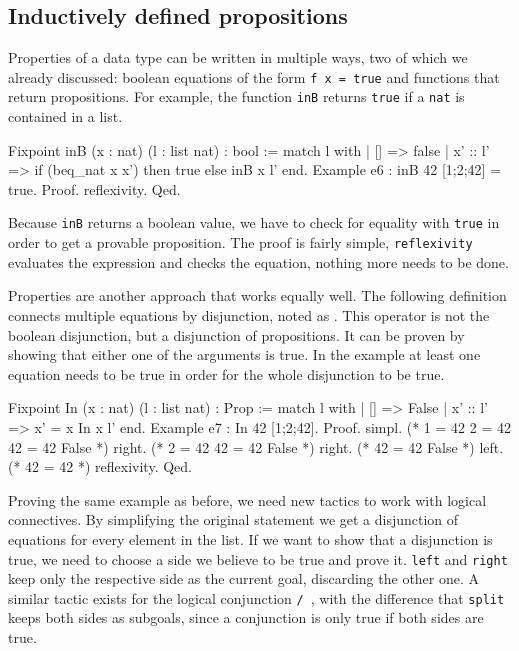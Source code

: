 \documentclass[paper = a4, fleqn, twoside]{scrreprt}
\newcommand{\coqinline}[1]{\texttt{#1}}
\begin{document}
\subsection{Inductively defined propositions}
\label{induprop}
Properties of a data type can be written in multiple ways, two of which we already discussed: boolean equations of the form \coqinline{f x = true} and functions that return propositions. For example, the function \coqinline{inB} returns \coqinline{true} if a \coqinline{nat} is contained in a list.
\begin{coqcode}
Fixpoint inB (x : nat) (l : list nat) : bool :=
  match l with
  | [] => false
  | x' :: l' => if (beq_nat x x') then true else inB x l'
  end.
Example e6 : inB 42 [1;2;42] = true.
Proof. reflexivity. Qed.
\end{coqcode}
Because \coqinline{inB} returns a boolean value, we have to check for equality with \coqinline{true} in order to get a provable proposition. The proof is fairly simple, \coqinline{reflexivity} evaluates the expression and checks the equation, nothing more needs to be done.\\
\par \noindent
Properties are another approach that works equally well. The following definition connects multiple equations by disjunction, noted as \coqinline{\/}. This operator is not the boolean disjunction, but a disjunction of propositions. It can be proven by showing that either one of the arguments is true. In the example at least one equation needs to be true in order for the whole disjunction to be true. 
\begin{coqcode}
Fixpoint In (x : nat) (l : list nat) : Prop :=
  match l with
  | [] => False
  | x' :: l' => x' = x \/ In x l'
  end.
Example e7 : In 42 [1;2;42].
Proof. 
  simpl. (* 1 = 42 \/ 2 = 42 \/ 42 = 42 \/ False *)
  right.           (* 2 = 42 \/ 42 = 42 \/ False *)
  right.                     (* 42 = 42 \/ False *)
  left.                      (* 42 = 42 *)
  reflexivity.
Qed.
\end{coqcode}
Proving the same example as before, we need new tactics to work with logical connectives. By simplifying the original statement we get a disjunction of equations for every element in the list. If we want to show that a disjunction is true, we need to choose a side we believe to be true and prove it. \coqinline{left} and \coqinline{right} keep only the respective side as the current goal, discarding the other one. A similar tactic exists for the logical conjunction \coqinline{/\ }, with the difference that \coqinline{split} keeps both sides as subgoals, since a conjunction is only true if both sides are true.\\
\end{document}
